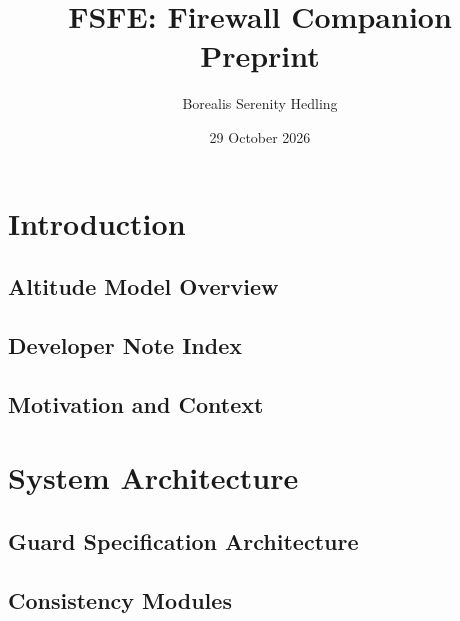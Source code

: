 \documentclass[11pt]{article}
\begin{document}
\title{FSFE: Firewall Companion Preprint}
\author{Borealis Serenity Hedling}
\date{29 October 2026}

\maketitle
\tableofcontents

\section{Introduction}

\subsection{Altitude Model Overview}


\subsection{Developer Note Index}


\subsection{Motivation and Context}

\section{System Architecture}

\subsection{Guard Specification Architecture}


\subsection{Consistency Modules}


\end{document}
